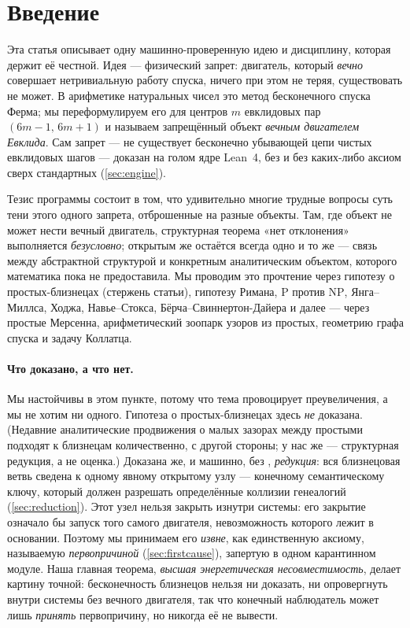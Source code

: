 \section{Введение}
\label{sec:intro}

Эта статья описывает одну машинно-проверенную идею и дисциплину, которая держит её честной.
Идея --- физический запрет: двигатель, который \emph{вечно} совершает нетривиальную работу
спуска, ничего при этом не теряя, существовать не может. В арифметике натуральных чисел это
метод бесконечного спуска Ферма; мы переформулируем его для центров $m$ евклидовых пар
$(6m-1,\,6m+1)$ и называем запрещённый объект \emph{вечным двигателем Евклида}. Сам запрет ---
не существует бесконечно убывающей цепи чистых евклидовых шагов --- доказан на голом ядре
Lean~4, без  и без каких-либо аксиом сверх стандартных (\cref{sec:engine}).

Тезис программы состоит в том, что удивительно многие трудные вопросы суть тени этого одного
запрета, отброшенные на разные объекты. Там, где объект не может нести вечный двигатель,
структурная теорема «нет отклонения» выполняется \emph{безусловно}; открытым же остаётся всегда
одно и то же --- связь между абстрактной структурой и конкретным аналитическим объектом,
которого математика пока не предоставила. Мы проводим это прочтение через гипотезу о
простых-близнецах (стержень статьи), гипотезу Римана, $\mathrm{P}$ против $\mathrm{NP}$,
Янга--Миллса, Ходжа, Навье--Стокса, Бёрча--Свиннертон-Дайера и далее --- через простые Мерсенна,
арифметический зоопарк узоров из простых, геометрию графа спуска и задачу Коллатца.

\paragraph{Что доказано, а что нет.}
Мы настойчивы в этом пункте, потому что тема провоцирует преувеличения, а мы не хотим ни
одного. Гипотеза о простых-близнецах здесь \emph{не} доказана. (Недавние аналитические продвижения о малых
зазорах между простыми~\cite{gpy2009,zhang2014,maynard2015} подходят к близнецам количественно, с
другой стороны; у нас же --- структурная редукция, а не оценка.) Доказана же, и машинно, без
, \emph{редукция}: вся близнецовая ветвь сведена к одному явному открытому узлу ---
конечному семантическому ключу, который должен разрешать определённые коллизии генеалогий
(\cref{sec:reduction}). Этот узел нельзя закрыть изнутри системы: его закрытие означало бы запуск
того самого двигателя, невозможность которого лежит в основании. Поэтому мы принимаем его
\emph{извне}, как единственную аксиому, называемую \emph{первопричиной} (\cref{sec:firstcause}),
запертую в одном карантинном модуле. Наша главная теорема, \emph{высшая энергетическая
несовместимость}, делает картину точной: бесконечность близнецов нельзя ни доказать, ни
опровергнуть внутри системы без вечного двигателя, так что конечный наблюдатель может лишь
\emph{принять} первопричину, но никогда её не вывести.

